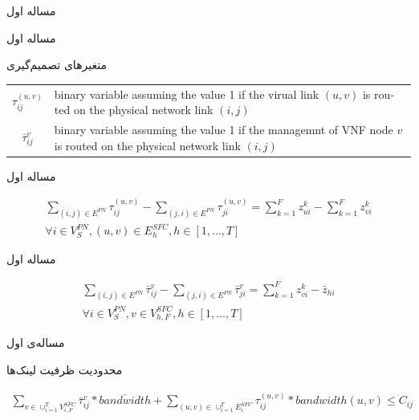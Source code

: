\documentclass{beamer}
\begin{document}
\begin{persian}
\begin{frame}{مساله اول}
\end{frame}
\begin{frame}{مساله اول}
	\par
	متغیرهای تصمیم‌گیری
	\begin{latin}\begin{tabular}{c p{10cm}}
		$\tau^{(u,v)}_{ij}$ & binary variable assuming the value 1 if the virual link $(u,v)$ is routed on the physical network link $(i,j)$\\
		$\bar{\tau}^{v}_{ij}$ & binary variable assuming the value 1 if the managemnt of VNF node $v$ is routed on the physical network link $(i,j)$\\
	\end{tabular}\end{latin}
\end{frame}
\begin{frame}{مساله اول}
	\par
	\begin{latin}\begin{align}
		\sum_{(i,j) \in E^{PN}} \tau_{ij}^{(u,v)} - \sum_{(j,i) \in E^{PN}} \tau_{ji}^{(u,v)} = \sum_{k=1}^{F} z_{ui}^{k} - \sum_{k=1}^{F} z_{vi}^{k} \nonumber \\
		\forall i \in V_{S}^{PN}, (u,v) \in E_{h}^{SFC}, h \in [1, ..., T]
	\end{align}\end{latin}
\end{frame}
\begin{frame}{مساله اول}
	\par
	\begin{latin}\begin{align}
		\sum_{(i,j) \in E^{PN}} \bar{\tau}_{ij}^{v} - \sum_{(j,i) \in E^{PN}} \bar{\tau}_{ji}^{v} = \sum_{k=1}^{F} z_{vi}^{k} - \bar{z}_{hi} \nonumber \\
		\forall i \in V_{S}^{PN}, v \in V_{h, F}^{SFC}, h \in [1, ..., T]
	\end{align}\end{latin}
\end{frame}
\begin{frame}{مساله‌ی اول}
	\par
	محدودیت ظرفیت لینک‌ها
	\begin{latin}\begin{align}
		\sum_{v \in \cup_{i=1}^{T} V_{i,F}^{SFC}} \bar{\tau}_{ij}^{v} * \bar{bandwidth} + \sum_{(u,v) \in \cup_{i=1}^{T} E_{i}^{SFC}} \tau_{ij}^{(u,v)} * bandwidth(u,v) \le C_{ij}
	\end{align}\end{latin}

\end{frame}
\end{persian}
\end{document}
